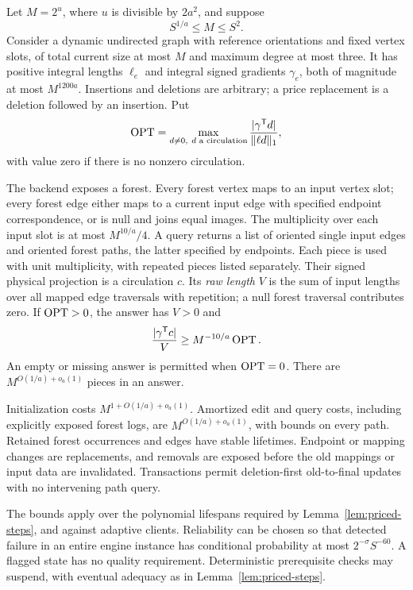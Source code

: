 \begin{lemma}\label{lem:flat-cycle}
Let $M=2^u$, where $u$ is divisible by $2a^2$, and suppose
\begin{equation}\label{engine:backend-size-range}
                         S^{1/a}\le M\le S^2.
\end{equation}
Consider a dynamic undirected graph with reference orientations and
fixed vertex slots, of total current size at most $M$ and maximum degree
at most three.  It has positive integral lengths $\ell_e$ and integral
signed gradients $\gamma_e$, both of magnitude at most $M^{1200a}$.
Insertions and deletions are arbitrary; a price replacement is a
deletion followed by an insertion.  Put
\[
 \operatorname{OPT}=\max_{d\ne0,\ d\text{ a circulation}}
          \frac{|\gamma^{\mathsf T}d|}{\|\ell d\|_1},
\]
with value zero if there is no nonzero circulation.

The backend exposes a forest.  Every forest vertex maps to an input
vertex slot; every forest edge either maps to a current input edge with
specified endpoint correspondence, or is null and joins equal images.
The multiplicity over each input slot is at most $M^{10/a}/4$.
A query returns a list of oriented single input edges and oriented
forest paths, the latter specified by endpoints.  Each piece is used
with unit multiplicity, with repeated pieces listed separately.  Their
signed physical projection is a circulation $c$.  Its \emph{raw length}
$V$ is the sum of input lengths over all mapped edge traversals with
repetition; a null forest traversal contributes zero.  If $\operatorname{OPT}>0$, the
answer has $V>0$ and
\begin{equation}\label{engine:flat-quality}
                   \frac{|\gamma^{\mathsf T}c|}{V}
                       \ge M^{-10/a}\operatorname{OPT}.
\end{equation}
An empty or missing answer is permitted when $\operatorname{OPT}=0$.
There are $M^{O(1/a)+o_a(1)}$ pieces in an answer.

Initialization costs $M^{1+O(1/a)+o_a(1)}$.  Amortized edit and query
costs, including explicitly exposed forest logs, are
$M^{O(1/a)+o_a(1)}$, with bounds on every path.  Retained forest
occurrences and edges have stable lifetimes.  Endpoint or mapping changes
are replacements, and removals are exposed before the old mappings or
input data are invalidated.  Transactions permit deletion-first
old-to-final updates with no intervening path query.

The bounds apply over the polynomial lifespans required by
Lemma~\ref{lem:priced-steps}, and against adaptive clients.  Reliability
can be chosen so that detected failure in an entire engine instance has
conditional probability at most $2^{-\sigma}S^{-60}$.  A flagged state
has no quality requirement.  Deterministic prerequisite checks may
suspend, with eventual adequacy as in Lemma~\ref{lem:priced-steps}.
\end{lemma}

